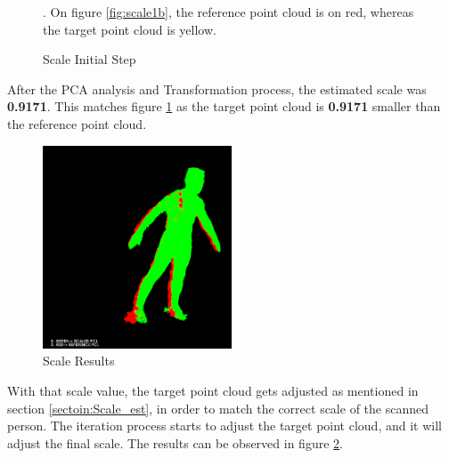 \documentclass[12pt]{report}
\begin{document}
\begin{figure}[H]%
  \centering
  \qquad
  \qquad
\caption{Scale Initial Step}. On figure \ref{fig:scale1b}, the reference point cloud is on red, whereas the target point cloud is yellow.
\label{fig:scale1} 
\end{figure}
 
After the PCA analysis and Transformation process, the estimated scale was \textbf{0.9171}. 
This matches figure \ref{fig:scale1} as the target point cloud is \textbf{0.9171} smaller than the reference point cloud.

\newpage

\begin{figure}
  \begin{center}
    \includegraphics[width=0.5\textwidth]{scaledexample.png}
  \end{center}
  \caption{Scale Results}
  \label{fig:scale_res1}
\end{figure}
With that scale value, the target point cloud gets adjusted as mentioned in section \ref{sectoin:Scale_est}, in order to match the correct scale of the scanned person. 
The iteration process starts to adjust the target point cloud, and it will adjust the final scale. The results can be observed in figure \ref{fig:scale_res1}.
\end{document}
